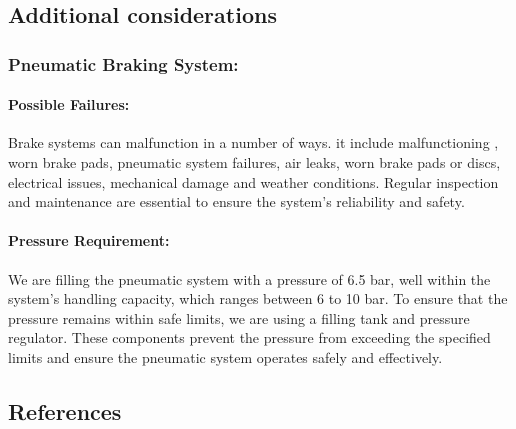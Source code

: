 \subsection{Additional considerations}
\noindent
\subsubsection{Pneumatic Braking System:}
\paragraph{Possible Failures:} Brake systems can malfunction in a number of ways. it include malfunctioning , worn brake pads, pneumatic system failures, air leaks, worn brake pads or discs, electrical issues,  mechanical damage and weather conditions. Regular inspection and maintenance are essential to ensure the system's reliability and safety.
\paragraph{Pressure Requirement:}We are filling the pneumatic system with a pressure of 6.5 bar, well within the system's handling capacity, which ranges between 6 to 10 bar. To ensure that the pressure remains within safe limits, we are using a filling tank and pressure regulator. These components prevent the pressure from exceeding the specified limits and ensure the pneumatic system operates safely and effectively.\\
  
	
\subsection{References}
